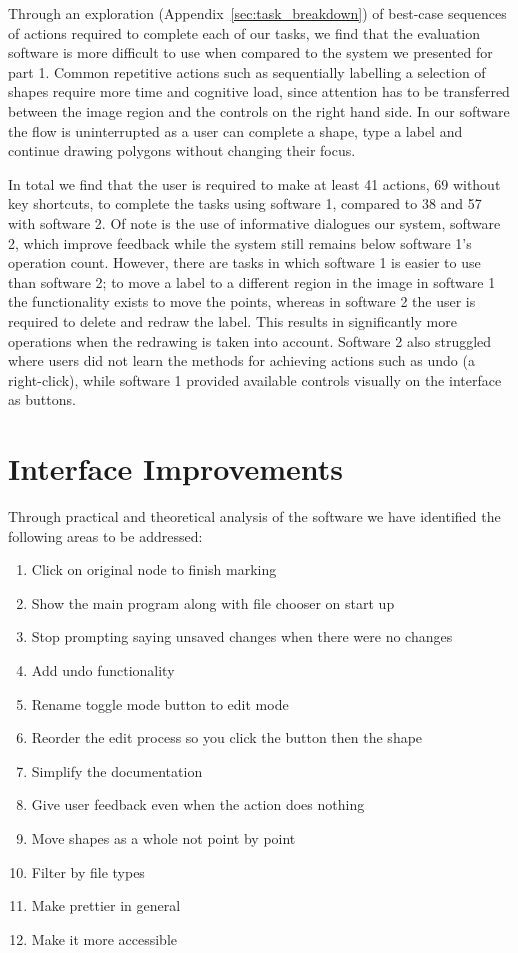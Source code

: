 \documentclass[a4paper,11pt,oneside]{article}
\begin{document}
Through an exploration (Appendix~\ref{sec:task_breakdown}) of best-case sequences of actions required to complete each of our tasks, we find that the evaluation software is more difficult to use when compared to the system we presented for part 1. Common repetitive actions such as sequentially labelling a selection of shapes require more time and cognitive load, since attention has to be transferred between the image region and the controls on the right hand side. In our software the flow is uninterrupted as a user can complete a shape, type a label and continue drawing polygons without changing their focus.

In total we find that the user is required to make at least 41 actions, 69 without key shortcuts, to complete the tasks using software 1, compared to 38 and 57 with software 2. Of note is the use of informative dialogues our system, software 2, which improve feedback while the system still remains below software 1's operation count. However, there are tasks in which software 1 is easier to use than software 2; to move a label to a different region in the image in software 1 the functionality exists to move the points, whereas in software 2 the user is required to delete and redraw the label. This results in significantly more operations when the redrawing is taken into account. Software 2 also struggled where users did not learn the methods for achieving actions such as undo (a right-click), while software 1 provided available controls visually on the interface as buttons.

\section{Interface Improvements}
Through practical and theoretical analysis of the software we have identified the following areas to be addressed:
\begin{enumerate}
    \item{Click on original node to finish marking}
    \item{Show the main program along with file chooser on start up}
    \item{Stop prompting saying unsaved changes when there were no changes}
    \item{Add undo functionality}
    \item{Rename toggle mode button to edit mode}
    \item{Reorder the edit process so you click the button then the shape}
    \item{Simplify the documentation}
    \item{Give user feedback even when the action does nothing}
    \item{Move shapes as a whole not point by point}
    \item{Filter by file types}
    \item{Make prettier in general}
    \item{Make it more accessible}
\end{enumerate}
\end{document}
